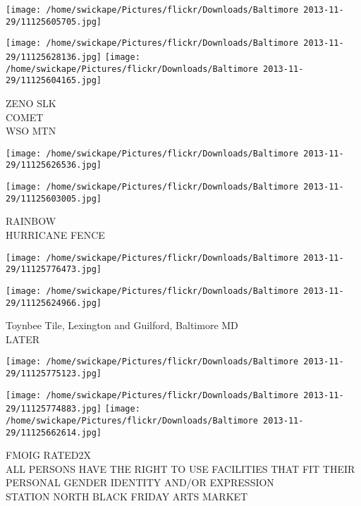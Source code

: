 \documentclass[10pt,letterpaper]{article}
\begin{document}
\texttt{[image: /home/swickape/Pictures/flickr/Downloads/Baltimore 2013-11-29/11125605705.jpg]}

\vspace{0.25in}
\texttt{[image: /home/swickape/Pictures/flickr/Downloads/Baltimore 2013-11-29/11125628136.jpg]}
\texttt{[image: /home/swickape/Pictures/flickr/Downloads/Baltimore 2013-11-29/11125604165.jpg]}

ZENO SLK\\
COMET\\
WSO MTN\\
\pagebreak

\texttt{[image: /home/swickape/Pictures/flickr/Downloads/Baltimore 2013-11-29/11125626536.jpg]}

\vspace{0.25in}
\texttt{[image: /home/swickape/Pictures/flickr/Downloads/Baltimore 2013-11-29/11125603005.jpg]}

RAINBOW\\
HURRICANE FENCE\\
\pagebreak

\texttt{[image: /home/swickape/Pictures/flickr/Downloads/Baltimore 2013-11-29/11125776473.jpg]}

\vspace{0.25in}
\texttt{[image: /home/swickape/Pictures/flickr/Downloads/Baltimore 2013-11-29/11125624966.jpg]}

Toynbee Tile, Lexington and Guilford, Baltimore MD\\
LATER\\
\pagebreak

\texttt{[image: /home/swickape/Pictures/flickr/Downloads/Baltimore 2013-11-29/11125775123.jpg]}

\vspace{0.25in}
\texttt{[image: /home/swickape/Pictures/flickr/Downloads/Baltimore 2013-11-29/11125774883.jpg]}
\texttt{[image: /home/swickape/Pictures/flickr/Downloads/Baltimore 2013-11-29/11125662614.jpg]}

FMOIG RATED2X\\
ALL PERSONS HAVE THE RIGHT TO USE FACILITIES THAT FIT THEIR PERSONAL GENDER IDENTITY AND/OR EXPRESSION\\
STATION NORTH BLACK FRIDAY ARTS MARKET\\
\pagebreak
\end{document}
